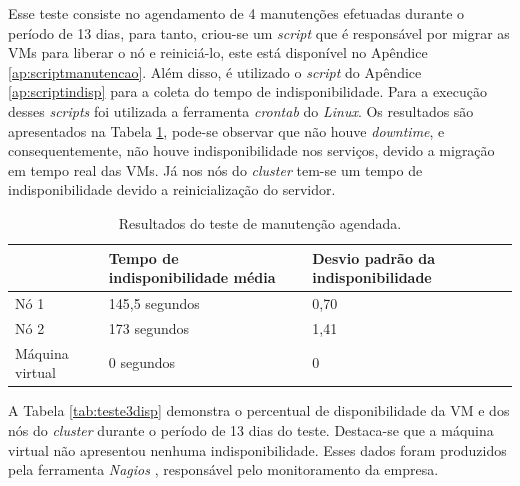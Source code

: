 Esse teste consiste no agendamento de 4 manutenções efetuadas durante o período de 13 dias, para tanto, criou-se um \textit{script} que é 
responsável por migrar as \acp{VM} para liberar o nó e reiniciá-lo, este está disponível no Apêndice \ref{ap:scriptmanutencao}. 
Além disso, é utilizado o \textit{script} do Apêndice \ref{ap:scriptindisp} para a coleta do tempo de indisponibilidade. 
Para a execução desses \textit{scripts} foi utilizada a ferramenta \textit{crontab} do \textit{Linux}. 
Os resultados são apresentados na Tabela \ref{tab:teste3resultados}, pode-se observar que não houve \textit{downtime}, e consequentemente, não 
houve indisponibilidade nos serviços, devido a migração em tempo real das \acp{VM}. Já nos nós do \textit{cluster} tem-se um tempo de 
indisponibilidade devido a reinicialização do servidor.


\begin{table}[h!]
\caption{Resultados do teste de manutenção agendada.}
\label{tab:teste3resultados}
\begin{center}
\begin{tabular}{|l|l|l|}\hline
 & \textbf{Tempo de indisponibilidade média} & \textbf{Desvio padrão da indisponibilidade} \\\hline
Nó 1 & 145,5 segundos & 0,70 \\\hline
Nó 2 & 173 segundos & 1,41 \\\hline
Máquina virtual & 0 segundos & 0 \\\hline
\end{tabular}
\end{center}
\end{table}

A Tabela \ref{tab:teste3disp} demonstra o percentual de disponibilidade da \ac{VM} e dos nós do \textit{cluster} durante o período de 13 dias
do teste. Destaca-se que a máquina virtual não apresentou nenhuma indisponibilidade. 
Esses dados foram produzidos pela ferramenta \textit{Nagios} \cite{nagios}, responsável pelo monitoramento da empresa.

